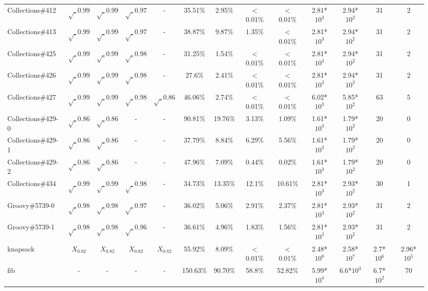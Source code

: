 \begin{table}[h!]
\begin{tabular}{lcccccccccccc}
    Collections\#412   & $\surd_{0.99}$ & $\surd_{0.99}$ & $\surd_{0.97}$ & - & 35.51\% & 2.95\% & $<$0.01\% & $<$0.01\% & 2.81*${10^3}$ & 2.94*${10^2}$ & 31 & 2 \\
    Collections\#413   & $\surd_{0.99}$ & $\surd_{0.99}$ & $\surd_{0.97}$ & - & 38.87\% & 9.87\% & 1.35\% & $<$0.01\% & 2.81*${10^3}$ & 2.94*${10^2}$ & 31 & 2 \\
    Collections\#425   & $\surd_{0.99}$ & $\surd_{0.99}$ & $\surd_{0.98}$ & - & 31.25\% & 1.54\% & $<$0.01\% & $<$0.01\% & 2.81*${10^3}$ & 2.94*${10^2}$ & 31 & 2 \\
    Collections\#426   & $\surd_{0.99}$ & $\surd_{0.99}$ & $\surd_{0.98}$ & - & 27.6\% & 2.41\% & $<$0.01\% & $<$0.01\% & 2.81*${10^3}$ & 2.94*${10^2}$ & 31 & 2 \\
    Collections\#427   & $\surd_{0.99}$ & $\surd_{0.99}$ & $\surd_{0.98}$ & $\surd_{0.86}$ & 46.06\% & 2.74\% & $<$0.01\% & $<$0.01\% & 6.02*${10^3}$ & 5.85*${10^2}$ & 63 & 5 \\
    Collections\#429-0 & $\surd_{0.86}$ & $\surd_{0.86}$ & - & - & 90.81\% & 19.76\% & 3.13\% & 1.09\% & 1.61*${10^3}$ & 1.79*${10^2}$ & 20 & 0 \\
    Collections\#429-1 & $\surd_{0.86}$ & $\surd_{0.86}$ & - & - & 37.79\% & 8.84\% & 6.29\% & 5.56\% & 1.61*${10^3}$ & 1.79*${10^2}$ & 20 & 0 \\
    Collections\#429-2 & $\surd_{0.86}$ & $\surd_{0.86}$ & - & - & 47.96\% & 7.09\% & 0.44\% & 0.02\% & 1.61*${10^3}$ & 1.79*${10^2}$ & 20 & 0 \\
    Collections\#434   & $\surd_{0.99}$ & $\surd_{0.99}$ & $\surd_{0.98}$ & - & 34.73\% & 13.35\% & 12.1\% & 10.61\% & 2.81*${10^3}$ & 2.93*${10^2}$ & 30 & 1 \\
    \midrule
    Groovy\#5739-0     & $\surd_{0.98}$ & $\surd_{0.98}$ & $\surd_{0.97}$ & - & 36.02\% & 5.06\% & 2.91\% & 2.37\% & 2.81*${10^3}$ & 2.93*${10^2}$ & 31 & 2 \\
    Groovy\#5739-1     & $\surd_{0.98}$ & $\surd_{0.98}$ & $\surd_{0.96}$ & - & 36.61\% & 4.96\% & 1.83\% & 1.56\% & 2.81*${10^3}$ & 2.93*${10^2}$ & 31 & 2 \\
    \midrule
    \midrule
    knapsack     & $X_{0.82}$ & $X_{0.82}$ & $X_{0.82}$ & $X_{0.82}$ & 55.92\% & 8.09\% & $<$0.01\% & $<$0.01\% & 2.48*${10^8}$ & 2.58*$10^{7}$ & 2.7*$10^{6}$ & 2.96*$10^{5}$ \\
    fib     & - & - & - & - & 150.63\% & 90.70\% & 58.8\% & 52.82\% & 5.99*${10^4}$ & 6.6*${10^3}$ & 6.7*$10^{2}$ & 70 \\

\end{tabular}
\end{table}
